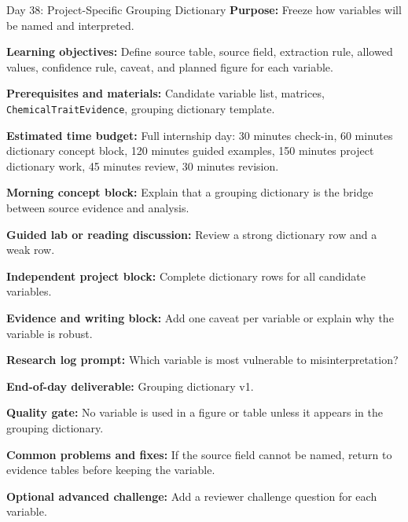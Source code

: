 \begin{dailybox}{Day 38: Project-Specific Grouping Dictionary}
\textbf{Purpose:} Freeze how variables will be named and interpreted.

\textbf{Learning objectives:} Define source table, source field, extraction rule, allowed values, confidence rule, caveat, and planned figure for each variable.

\textbf{Prerequisites and materials:} Candidate variable list, matrices, \texttt{ChemicalTraitEvidence}, grouping dictionary template.

\textbf{Estimated time budget:} Full internship day: 30 minutes check-in, 60 minutes dictionary concept block, 120 minutes guided examples, 150 minutes project dictionary work, 45 minutes review, 30 minutes revision.

\textbf{Morning concept block:} Explain that a grouping dictionary is the bridge between source evidence and analysis.

\textbf{Guided lab or reading discussion:} Review a strong dictionary row and a weak row.

\textbf{Independent project block:} Complete dictionary rows for all candidate variables.

\textbf{Evidence and writing block:} Add one caveat per variable or explain why the variable is robust.

\textbf{Research log prompt:} Which variable is most vulnerable to misinterpretation?

\textbf{End-of-day deliverable:} Grouping dictionary v1.

\textbf{Quality gate:} No variable is used in a figure or table unless it appears in the grouping dictionary.

\textbf{Common problems and fixes:} If the source field cannot be named, return to evidence tables before keeping the variable.

\textbf{Optional advanced challenge:} Add a reviewer challenge question for each variable.
\end{dailybox}

